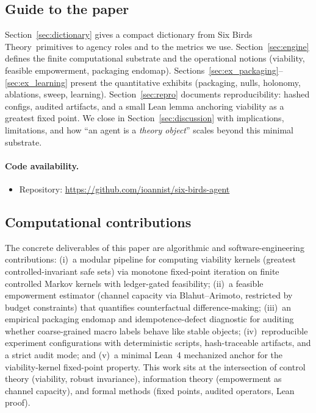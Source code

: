 \documentclass[11pt]{article}
\newcommand{\SBT}{Six Birds Theory}
\begin{document}
\subsection{Guide to the paper}
Section~\ref{sec:dictionary} gives a compact dictionary from \SBT\ primitives to agency roles and to the metrics we use. Section~\ref{sec:engine} defines the finite computational substrate and the operational notions (viability, feasible empowerment, packaging endomap). Sections~\ref{sec:ex_packaging}--\ref{sec:ex_learning} present the quantitative exhibits (packaging, nulls, holonomy, ablations, sweep, learning). Section~\ref{sec:repro} documents reproducibility: hashed configs, audited artifacts, and a small Lean lemma anchoring viability as a greatest fixed point. We close in Section~\ref{sec:discussion} with implications, limitations, and how ``an agent is a \emph{theory object}'' scales beyond this minimal substrate.

\paragraph{Code availability.}
\begin{itemize}[noitemsep,topsep=2pt]
\item Repository: \url{https://github.com/ioannist/six-birds-agent}
\end{itemize}

\subsection*{Computational contributions}
The concrete deliverables of this paper are algorithmic and software-engineering contributions:
(i)~a modular pipeline for computing viability kernels (greatest controlled-invariant safe sets) via monotone fixed-point iteration on finite controlled Markov kernels with ledger-gated feasibility;
(ii)~a feasible empowerment estimator (channel capacity via Blahut--Arimoto, restricted by budget constraints) that quantifies counterfactual difference-making;
(iii)~an empirical packaging endomap and idempotence-defect diagnostic for auditing whether coarse-grained macro labels behave like stable objects;
(iv)~reproducible experiment configurations with deterministic scripts, hash-traceable artifacts, and a strict audit mode;
and (v)~a minimal Lean~4 mechanized anchor for the viability-kernel fixed-point property.
This work sits at the intersection of control theory (viability, robust invariance), information theory (empowerment as channel capacity), and formal methods (fixed points, audited operators, Lean proof).
\end{document}
